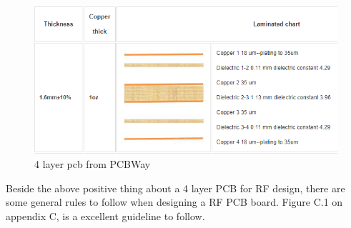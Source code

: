 \begin{figure}[h]
\centering
\includegraphics[scale=0.8]{figures/PCB4.PNG}
\caption{4 layer pcb from PCBWay \cite{PCB}}
\end{figure}

Beside the above positive thing about a 4 layer PCB for RF design, there are some general rules to follow when designing a RF PCB board. Figure C.1 on appendix C, is a excellent guideline to follow.   



